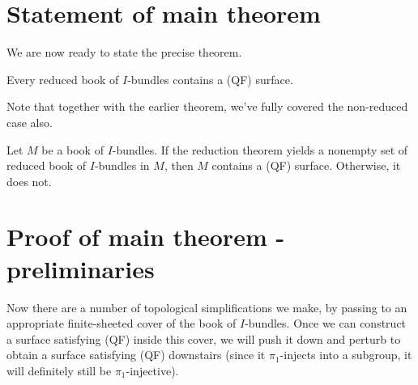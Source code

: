 \section{Statement of main theorem}

We are now ready to state the precise theorem.

\begin{thm}

Every reduced book of $I$-bundles contains a (QF) surface.

\end{thm}

Note that together with the earlier theorem, we've fully covered the
non-reduced case also.

\begin{thm}

Let $M$ be a book of $I$-bundles. If the reduction theorem yields a nonempty
set of reduced book of $I$-bundles in $M$, then $M$ contains a (QF) surface.
Otherwise, it does not.

\end{thm}

\section{Proof of main theorem - preliminaries}

Now there are a number of topological simplifications we make, by passing to an
appropriate finite-sheeted cover of the book of $I$-bundles.  Once we can
construct a surface satisfying (QF) inside this cover, we will push it down and
perturb to obtain a surface satisfying (QF) downstairs (since it
$\pi_1$-injects into a subgroup, it will definitely still be
$\pi_1$-injective).


